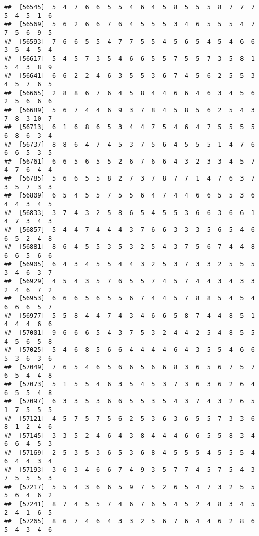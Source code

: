 \documentclass[
]{book}
\begin{document}
\begin{verbatim}
##  [56545]  5  4  7  6  6  5  5  4  6  4  5  8  5  5  5  8  7  7  7  5  4  5  1  6
##  [56569]  5  6  2  6  6  7  6  4  5  5  5  3  4  6  5  5  5  4  7  7  5  6  9  5
##  [56593]  7  6  6  5  5  4  7  7  5  5  4  5  6  5  4  5  4  6  6  3  5  4  5  4
##  [56617]  5  4  5  7  3  5  4  6  6  5  5  7  5  5  7  3  5  8  1  5  4  3  8  9
##  [56641]  6  6  2  2  4  6  3  5  5  3  6  7  4  5  6  2  5  5  3  4  5  7  6  5
##  [56665]  2  8  8  6  7  6  4  5  8  4  4  6  6  4  6  3  4  5  6  2  5  6  6  6
##  [56689]  5  6  7  4  4  6  9  3  7  8  4  5  8  5  6  2  5  4  3  7  8  3 10  7
##  [56713]  6  1  6  8  6  5  3  4  4  7  5  4  6  4  7  5  5  5  5  6  8  6  3  4
##  [56737]  8  8  6  4  7  4  5  3  7  5  6  4  5  5  5  1  4  7  6  6  6  5  3  5
##  [56761]  6  6  5  6  5  5  2  6  7  6  6  4  3  2  3  3  4  5  7  4  7  6  4  4
##  [56785]  5  6  6  5  5  8  2  7  3  7  8  7  7  1  4  7  6  3  7  3  5  7  3  3
##  [56809]  6  5  4  5  5  7  5  5  6  4  7  4  4  6  6  5  5  3  6  4  4  3  4  5
##  [56833]  3  7  4  3  2  5  8  6  5  4  5  5  3  6  6  3  6  6  1  4  7  3  4  3
##  [56857]  5  4  4  7  4  4  4  3  7  6  6  3  3  3  5  6  5  4  6  6  5  2  4  8
##  [56881]  8  6  4  5  5  3  5  3  2  5  4  3  7  5  6  7  4  4  8  6  6  5  6  6
##  [56905]  6  4  3  4  5  5  4  4  3  2  5  3  7  3  3  2  5  5  5  3  4  6  3  7
##  [56929]  4  5  4  3  5  7  6  5  5  7  4  5  7  4  4  3  4  3  3  2  4  6  7  2
##  [56953]  6  6  6  5  6  5  5  6  7  4  4  5  7  8  8  5  4  5  4  6  6  6  5  7
##  [56977]  5  5  8  4  4  7  4  3  4  6  6  5  8  7  4  4  8  5  1  4  4  4  6  6
##  [57001]  9  6  6  6  5  4  3  7  5  3  2  4  4  2  5  4  8  5  5  4  5  6  5  8
##  [57025]  5  4  6  8  5  6  6  4  4  4  4  6  4  3  5  5  4  6  6  5  3  6  3  6
##  [57049]  7  6  5  4  6  5  6  6  5  6  6  8  3  6  5  6  7  5  7  6  5  4  4  8
##  [57073]  5  1  5  5  4  6  3  5  4  5  3  7  3  6  3  6  2  6  4  6  5  5  4  8
##  [57097]  6  3  3  5  3  6  6  5  5  3  5  4  3  7  4  3  2  6  5  1  7  5  5  5
##  [57121]  4  5  7  5  7  5  6  2  5  3  6  3  6  5  5  7  3  3  6  8  1  2  4  6
##  [57145]  3  3  5  2  4  6  4  3  8  4  4  4  6  6  5  5  8  3  4  6  6  4  5  3
##  [57169]  2  5  3  5  3  6  5  3  6  8  4  5  5  5  4  5  5  5  4  6  4  4  3  4
##  [57193]  3  6  3  4  6  6  7  4  9  3  5  7  7  4  5  7  5  4  3  7  5  5  5  3
##  [57217]  5  5  4  3  6  6  5  9  7  5  2  6  5  4  7  3  2  5  5  5  6  4  6  2
##  [57241]  8  7  4  5  5  7  4  6  7  6  5  4  5  2  4  8  3  4  5  2  4  1  6  5
##  [57265]  8  6  7  4  6  4  3  3  2  5  6  7  6  4  4  6  2  8  6  5  4  3  4  6

\end{verbatim}
\end{document}
